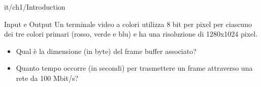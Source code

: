 \documentclass[11pt]{article}
\begin{document}
\begin{quiz}{it/ch1/Introduction}
\begin{cloze}[points=1,shuffle=false]{Input e Output}
Un terminale video a colori utilizza 8 bit per pixel per ciascuno dei tre colori primari (rosso, verde e blu) e ha una risoluzione di 1280x1024 pixel.
\begin{itemize}
    \item Qual è la dimensione (in byte) del frame buffer associato? 
    \item Quanto tempo occorre (in secondi) per trasmettere un frame attraverso una rete da 100 Mbit/s?
\end{itemize}
\end{cloze}


\end{quiz}
\end{document}

